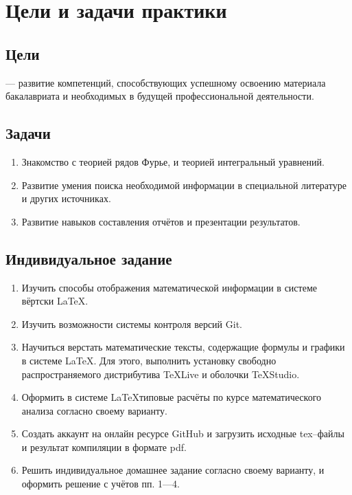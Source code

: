 \documentclass[12pt]{article}
\begin{document}
\newpage	
\tableofcontents

\newpage
\section{Цели и задачи практики}	
\subsection{Цели}
--- развитие компетенций, способствующих успешному освоению материала бакалавриата и необходимых в будущей профессиональной деятельности.

\subsection{Задачи}
\begin{enumerate}
\item Знакомство с теорией рядов Фурье, и теорией интегральный уравнений.
\item Развитие умения поиска необходимой информации в специальной литературе и других источниках.
\item Развитие навыков составления отчётов и презентации результатов.
\end{enumerate}

\subsection{Индивидуальное задание}	
\begin{enumerate}
\item Изучить способы отображения математической информации в системе вёртски \LaTeX.
\item Изучить возможности  системы контроля версий \textsf{Git}.
\item Научиться верстать математические тексты, содержащие формулы и графики в системе \LaTeX.
Для этого, выполнить установку свободно распространяемого дистрибутива \textsf{TeXLive} и оболочки \textsf{TeXStudio}.
\item Оформить в системе \LaTeX типовые расчёты по курсе математического анализа согласно своему варианту.
\item Создать аккаунт на онлайн ресурсе \textsf{GitHub} и загрузить исходные \textsf{tex}--файлы 
и результат компиляции в формате \textsf{pdf}.
\item Решить индивидуальное домашнее задание согласно своему варианту, и оформить решение с учётов пп. 1---4.
\end{enumerate} 
\end{document}
